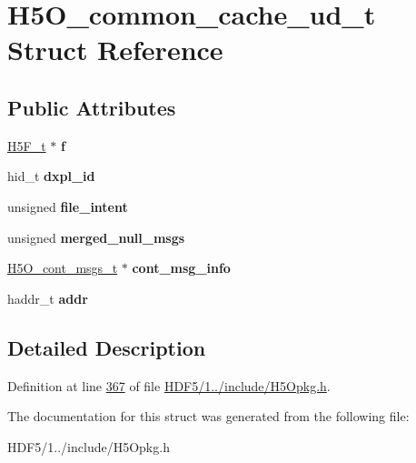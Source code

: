 \hypertarget{struct_h5_o__common__cache__ud__t}{}\section{H5\+O\+\_\+common\+\_\+cache\+\_\+ud\+\_\+t Struct Reference}
\label{struct_h5_o__common__cache__ud__t}
\subsection*{Public Attributes}
\begin{DoxyCompactItemize}
\item 
\mbox{\label{struct_h5_o__common__cache__ud__t_a3432055befa974f0f3ab3199bab2c958}} 
\hyperlink{struct_h5_f__t}{H5\+F\+\_\+t} $\ast$ {\bfseries f}
\item 
\mbox{\label{struct_h5_o__common__cache__ud__t_a4ba523971da6f2ee8266e4c2717552b3}} 
hid\+\_\+t {\bfseries dxpl\+\_\+id}
\item 
\mbox{\label{struct_h5_o__common__cache__ud__t_a5432a3bc7b8933cf6c324263c9b96dca}} 
unsigned {\bfseries file\+\_\+intent}
\item 
\mbox{\label{struct_h5_o__common__cache__ud__t_ab9a033394ff6864716cdc362d037ba3d}} 
unsigned {\bfseries merged\+\_\+null\+\_\+msgs}
\item 
\mbox{\label{struct_h5_o__common__cache__ud__t_a695a0c55cab88d526bbbc98e7c2dad0a}} 
\hyperlink{struct_h5_o__cont__msgs__t}{H5\+O\+\_\+cont\+\_\+msgs\+\_\+t} $\ast$ {\bfseries cont\+\_\+msg\+\_\+info}
\item 
\mbox{\label{struct_h5_o__common__cache__ud__t_a06d8d3f4e746c0d3d04d467ca38e8243}} 
haddr\+\_\+t {\bfseries addr}
\end{DoxyCompactItemize}


\subsection{Detailed Description}


Definition at line \hyperlink{_h_d_f5_21_810_81_2include_2_h5_opkg_8h_source_l00367}{367} of file \hyperlink{_h_d_f5_21_810_81_2include_2_h5_opkg_8h_source}{H\+D\+F5/1../include/\+H5\+Opkg.\+h}.



The documentation for this struct was generated from the following file\+:\begin{DoxyCompactItemize}
\item 
H\+D\+F5/1../include/\+H5\+Opkg.\+h\end{DoxyCompactItemize}
